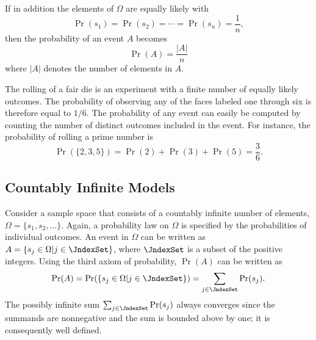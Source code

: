 If in addition the elements of $\Omega$ are equally likely with
\begin{equation*}
\Pr (s_1) = \Pr (s_2) = \cdots = \Pr (s_n) = \frac{1}{n} ,
\end{equation*}
then the probability of an event $A$ becomes
\begin{equation} \label{equation:ProbEquiProbableOutcomes}
\Pr (A) = \frac{ |A| }{n}
\end{equation}
where $|A|$ denotes the number of elements in $A$.

\begin{example}
The rolling of a fair die is an experiment with a finite number of equally likely outcomes.
The probability of observing any of the faces labeled one through six is therefore equal to $1/6$.
The probability of any event can easily be computed by counting the number of distinct outcomes included in the event.
For instance, the probability of rolling a prime number is
\begin{equation*}
\Pr ( \{ 2, 3, 5 \} )
= \Pr (2) + \Pr(3) + \Pr(5) = \frac{3}{6} .
\end{equation*}
\end{example}


\subsection{Countably Infinite Models}

Consider a sample space that consists of a countably infinite number of elements, $\Omega = \{ s_1, s_2, \ldots \}$.
Again, a probability law on $\Omega$ is specified by the probabilities of individual outcomes.
An event in $\Omega$ can be written as $A = \{ s_j \in \Omega | j \in \JndexSet \}$, where $\JndexSet$ is a subset of the positive integers.
Using the third axiom of probability, $\Pr (A)$ can be written as
\begin{equation*}
\Pr (A)
= \Pr ( \{ s_j \in \Omega | j \in \JndexSet \} )
= \sum_{j \in \JndexSet} \Pr (s_j) .
\end{equation*}
The possibly infinite sum $\sum_{j \in \JndexSet} \Pr (s_j)$ always converges since the summands are nonnegative and the sum is bounded above by one; it is consequently well defined.

